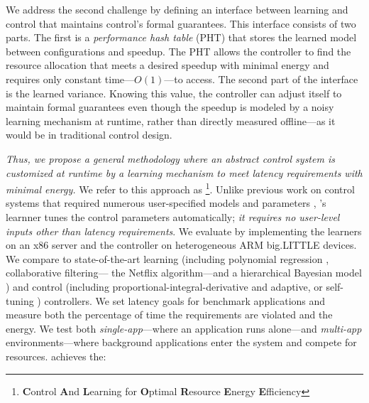 We address the second challenge by defining an interface between
learning and control that maintains control's formal guarantees.  This
interface consists of two parts.  The first is a \emph{performance
  hash table} (PHT) that stores the learned model between
configurations and speedup.  The PHT allows the controller to find the
resource allocation that meets a desired speedup with minimal energy
and requires only constant time---$O(1)$---to access.  The second part
of the interface is the learned variance.  Knowing this value, the
controller can adjust itself to maintain formal guarantees even though
the speedup is modeled by a noisy learning mechanism at runtime,
rather than directly measured offline---as it would be in traditional
control design.


\emph{Thus, we propose a general methodology where an abstract control
  system is customized at runtime by a learning mechanism to meet
  latency requirements with minimal energy.} We refer to this
approach as \SYSTEM{}\footnote{\textbf{C}ontrol \textbf{A}nd
  \textbf{L}earning for \textbf{O}ptimal \textbf{R}esource
  \textbf{E}nergy \textbf{E}fficiency}.  Unlike previous work on
control systems that required numerous user-specified models and
parameters \cite{METE,Chen2011,POET,ControlWare,Agilos}, \SYSTEM{}'s
learnner tunes the control parameters automatically; \ie{} \emph{it
  requires no user-level inputs other than latency requirements}.
We evaluate \SYSTEM{} by implementing the learners on an x86 server
and the controller on heterogeneous ARM big.LITTLE devices.  We
compare to state-of-the-art learning (including polynomial regression
\cite{Koala,dubach2010}, collaborative filtering---\ie{} the Netflix
algorithm\cite{netflix,Paragon}---and a hierarchical Bayesian model
\cite{LEO}) and control (including proportional-integral-derivative
\cite{Hellerstein2004a} and adaptive, or self-tuning
\cite{HandbookControl}) controllers.  We set latency goals for
benchmark applications and measure both the percentage of time the
requirements are violated and the energy.  We test both
\emph{single-app}---where an application runs alone---and
\emph{multi-app} environments---where background applications enter
the system and compete for resources.  \SYSTEM{} achieves the:
